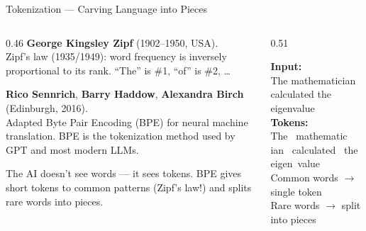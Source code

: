 \begin{frame}{Tokenization --- Carving Language into Pieces}

  \begin{columns}[T]
    \begin{column}{0.46\textwidth}
      {\footnotesize
      \textbf{George Kingsley Zipf} (1902--1950, USA).\\
      \alert{Zipf's law} (1935/1949): word frequency is inversely
      proportional to its rank. ``The'' is \#1, ``of'' is \#2, \ldots}

      \vspace{0.3em}
      {\footnotesize
      \textbf{Rico Sennrich}, \textbf{Barry Haddow},
      \textbf{Alexandra Birch} (Edinburgh, 2016).\\
      Adapted \alert{Byte Pair Encoding} (BPE) for neural machine
      translation. BPE is the tokenization method used by GPT and most
      modern LLMs.}

      \vspace{0.3em}
      \begin{insightbox}
        The AI doesn't see words --- it sees tokens. BPE gives short
        tokens to common patterns (Zipf's law!) and splits rare words
        into pieces.
      \end{insightbox}
    \end{column}

    \begin{column}{0.51\textwidth}
      \begin{tcolorbox}[colback=aiViolet!5, colframe=aiViolet!60,
        fonttitle=\bfseries\small, title={BPE Tokenization Example},
        rounded corners, boxrule=0.5pt, left=3pt, right=3pt, top=3pt, bottom=3pt]
        \footnotesize
        \textbf{Input:}\\
        {\ttfamily The mathematician calculated the eigenvalue}\\[4pt]
        \textbf{Tokens:}\\
        \colorbox{aiViolet!15}{\ttfamily The}\;
        \colorbox{aiViolet!25}{\ttfamily\, mathematic}\,%
        \colorbox{aiViolet!35}{\ttfamily ian}\;
        \colorbox{aiViolet!15}{\ttfamily\, calculated}\;
        \colorbox{aiViolet!15}{\ttfamily\, the}\;
        \colorbox{aiViolet!25}{\ttfamily\, eigen}\,%
        \colorbox{aiViolet!35}{\ttfamily value}\\[4pt]
        {\scriptsize Common words \(\to\) single token\\
        Rare words \(\to\) split into pieces}
      \end{tcolorbox}


\end{column}
\end{columns}
\end{frame}
